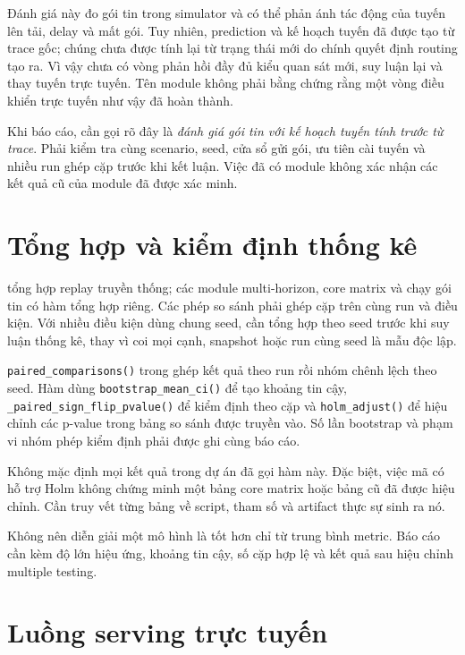 \documentclass[12pt,a4paper]{article}
\newcommand{\code}[1]{{\small\texttt{#1}}}
\begin{document}
Đánh giá này đo gói tin trong simulator và có thể phản ánh tác động của tuyến lên tải, delay và mất gói. Tuy nhiên, prediction và kế hoạch tuyến đã được tạo từ trace gốc; chúng chưa được tính lại từ trạng thái mới do chính quyết định routing tạo ra. Vì vậy chưa có vòng phản hồi đầy đủ kiểu quan sát mới, suy luận lại và thay tuyến trực tuyến. Tên module không phải bằng chứng rằng một vòng điều khiển trực tuyến như vậy đã hoàn thành.

Khi báo cáo, cần gọi rõ đây là \emph{đánh giá gói tin với kế hoạch tuyến tính trước từ trace}. Phải kiểm tra cùng scenario, seed, cửa sổ gửi gói, ưu tiên cài tuyến và nhiều run ghép cặp trước khi kết luận. Việc đã có module không xác nhận các kết quả cũ của module đã được xác minh.

\section{Tổng hợp và kiểm định thống kê}
\label{sec:evaluation}

 tổng hợp replay truyền thống; các module multi-horizon, core matrix và chạy gói tin có hàm tổng hợp riêng. Các phép so sánh phải ghép cặp trên cùng run và điều kiện. Với nhiều điều kiện dùng chung seed, cần tổng hợp theo seed trước khi suy luận thống kê, thay vì coi mọi cạnh, snapshot hoặc run cùng seed là mẫu độc lập.

\code{paired\_comparisons()} trong  ghép kết quả theo run rồi nhóm chênh lệch theo seed. Hàm dùng \code{bootstrap\_mean\_ci()} để tạo khoảng tin cậy, \code{\_paired\_sign\_flip\_pvalue()} để kiểm định theo cặp và \code{holm\_adjust()} để hiệu chỉnh các p-value trong bảng so sánh được truyền vào. Số lần bootstrap và phạm vi nhóm phép kiểm định phải được ghi cùng báo cáo.

Không mặc định mọi kết quả trong dự án đã gọi hàm này. Đặc biệt, việc mã có hỗ trợ Holm không chứng minh một bảng core matrix hoặc bảng cũ đã được hiệu chỉnh. Cần truy vết từng bảng về script, tham số và artifact thực sự sinh ra nó.

Không nên diễn giải một mô hình là tốt hơn chỉ từ trung bình metric. Báo cáo cần kèm độ lớn hiệu ứng, khoảng tin cậy, số cặp hợp lệ và kết quả sau hiệu chỉnh multiple testing.

\section{Luồng serving trực tuyến}
\label{sec:serving}
\end{document}
